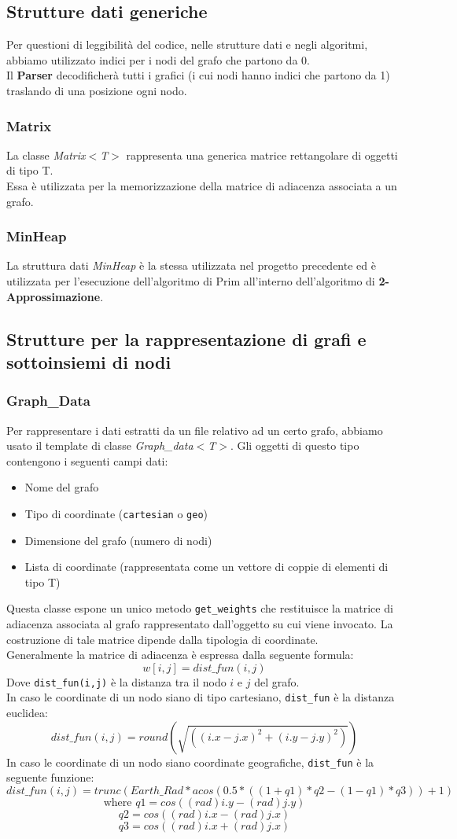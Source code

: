 \documentclass[]{article}
\begin{document}
\subsection{Strutture dati generiche}
Per questioni di leggibilità del codice, nelle strutture dati e negli algoritmi, abbiamo utilizzato indici per i nodi del grafo che partono da 0.\\
Il \textbf{Parser} decodificherà tutti i grafici (i cui nodi hanno indici che partono da 1) traslando di una posizione ogni nodo.
\subsubsection{Matrix}
La classe \textit{Matrix$<$T$>$} rappresenta una generica matrice rettangolare di oggetti di tipo T.\\
Essa è utilizzata per la memorizzazione della matrice di adiacenza associata a un grafo.
\subsubsection{MinHeap}
La struttura dati \textit{MinHeap} è la stessa utilizzata nel progetto precedente ed è utilizzata per l'esecuzione dell'algoritmo di Prim all'interno dell'algoritmo di \textbf{2-Approssimazione}.
\subsection{Strutture per la rappresentazione di grafi e sottoinsiemi di nodi}
\subsubsection{Graph\_Data}
Per rappresentare i dati estratti da un file relativo ad un certo grafo, abbiamo usato il template di classe \textit{Graph\_data$<$T$>$}. Gli oggetti di questo tipo contengono i seguenti campi dati:
\begin{itemize}
	\item Nome del grafo
	\item Tipo di coordinate (\verb|cartesian| o \verb|geo|)
	\item Dimensione del grafo (numero di nodi)
	\item Lista di coordinate (rappresentata come un vettore di coppie di elementi di tipo T)
\end{itemize}
Questa classe espone un unico metodo \verb|get_weights| che restituisce la matrice di adiacenza associata al grafo rappresentato dall'oggetto su cui viene invocato. La costruzione di tale matrice dipende dalla tipologia di coordinate.\\
Generalmente la matrice di adiacenza è espressa dalla seguente formula:
$$w[i,j]=dist\_fun(i, j)$$
Dove \verb|dist_fun(i,j)| è la distanza tra il nodo $i$ e $j$ del grafo.\\
In caso le coordinate di un nodo siano di tipo cartesiano, \verb|dist_fun| è la distanza euclidea:
$$dist\_fun(i,j)=round(\sqrt{((i.x - j.x)^2 + (i.y - j.y)^2)})$$
In caso le coordinate di un nodo siano coordinate geografiche, \verb|dist_fun| è la seguente funzione:
$$dist\_fun(i,j) = trunc(Earth\_Rad * acos(0.5*((1+q1)*q2-(1-q1)*q3))+1)$$
$$\text{where } q1 = cos((rad)i.y - (rad)j.y)$$
$$q2 = cos((rad)i.x - (rad)j.x)$$
$$q3 = cos((rad)i.x + (rad)j.x)$$
\end{document}
